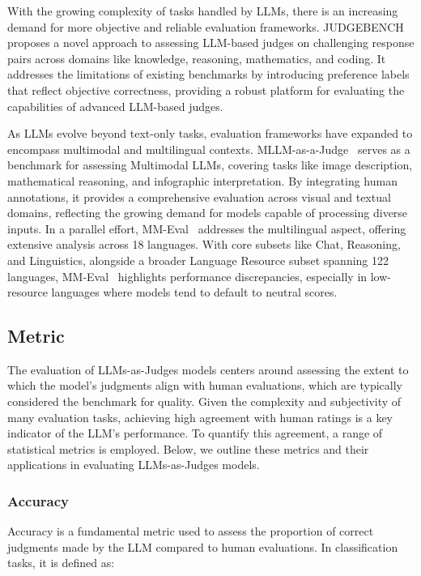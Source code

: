 With the growing complexity of tasks handled by LLMs, there is an increasing demand for more objective and reliable evaluation frameworks. JUDGEBENCH~\cite{tan2024judgebench} proposes a novel approach to assessing LLM-based judges on challenging response pairs across domains like knowledge, reasoning, mathematics, and coding. It addresses the limitations of existing benchmarks by introducing preference labels that reflect objective correctness, providing a robust platform for evaluating the capabilities of advanced LLM-based judges.

As LLMs evolve beyond text-only tasks, evaluation frameworks have expanded to encompass multimodal and multilingual contexts. MLLM-as-a-Judge~\cite{chen2024mllm} serves as a benchmark for assessing Multimodal LLMs, covering tasks like image description, mathematical reasoning, and infographic interpretation. By integrating human annotations, it provides a comprehensive evaluation across visual and textual domains, reflecting the growing demand for models capable of processing diverse inputs. In a parallel effort, MM-Eval~\cite{son2024mm} addresses the multilingual aspect, offering extensive analysis across 18 languages. With core subsets like Chat, Reasoning, and Linguistics, alongside a broader Language Resource subset spanning 122 languages, MM-Eval~\cite{son2024mm} highlights performance discrepancies, especially in low-resource languages where models tend to default to neutral scores. 




\subsection{Metric}
\label{sec:metric}
The evaluation of LLMs-as-Judges models centers around assessing the extent to which the model's judgments align with human evaluations, which are typically considered the benchmark for quality. Given the complexity and subjectivity of many evaluation tasks, achieving high agreement with human ratings is a key indicator of the LLM's performance. To quantify this agreement, a range of statistical metrics is employed. Below, we outline these metrics and their applications in evaluating LLMs-as-Judges models.


\subsubsection{Accuracy}

Accuracy is a fundamental metric used to assess the proportion of correct judgments made by the LLM compared to human evaluations. In classification tasks, it is defined as:

